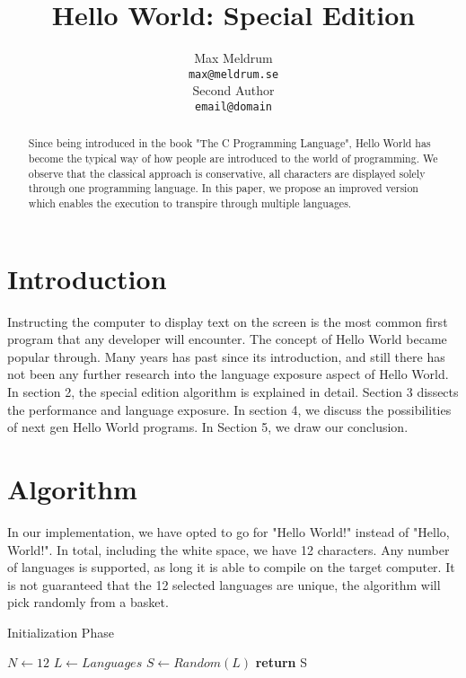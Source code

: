 \documentclass[11pt]{article}
\title{Hello World: Special Edition}
\author{Max Meldrum \\
{\tt max@meldrum.se} \\\And
Second Author \\
{\tt email@domain} \\}
\date{}
\begin{document}
\maketitle
\begin{abstract}
Since being introduced in the book "The C Programming Language", Hello World has become the typical way of how people are introduced to the world of programming. We observe that the classical approach is conservative, all characters are displayed solely through one programming language. In this paper, we propose an improved version which enables the execution to transpire through multiple languages.
\end{abstract}

\section{Introduction}
Instructing the computer to display text on the screen is the most common first program that any developer will encounter. The concept of Hello World became popular through\cite{Kernighan:1988:CPL:576122}. Many years has past since its introduction, and still there has not been any further research into the language exposure aspect of Hello World.
\newline{}\newline{}
In section 2, the special edition algorithm is explained in detail. Section 3 dissects the performance and language exposure. In section 4, we discuss the possibilities of next gen Hello World programs. In Section 5, we draw our conclusion.

\section{Algorithm}
In our implementation, we have opted to go for "Hello World!" instead of "Hello, World!". In total, including the white space, we have 12 characters. Any number of languages is supported, as long it is able to compile on the target computer. It is not guaranteed that the 12 selected languages are unique, the algorithm will pick randomly from a basket.
\begin{algorithm}
\caption{Initialization Phase}
\label{Special Edition}
\begin{algorithmic}[1]
\State $N\gets 12$
\State $L\gets Languages$
	\State $S\gets Random(L)$
\EndFor
\State \textbf{return} S
\EndProcedure
\end{algorithmic}
\end{algorithm}
\end{document}

